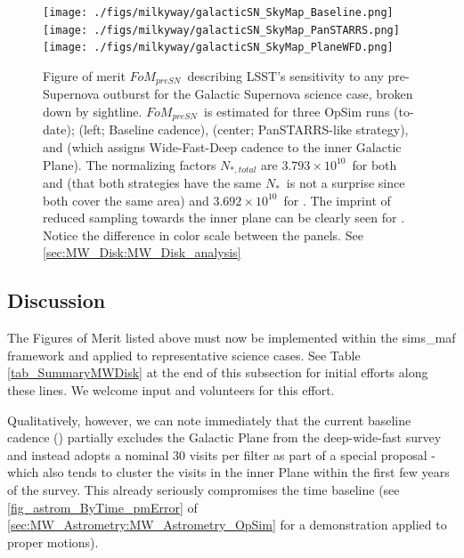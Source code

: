 \begin{figure}
\begin{center}
  \texttt{[image: ./figs/milkyway/galacticSN\_SkyMap\_Baseline.png]}
  \texttt{[image: ./figs/milkyway/galacticSN\_SkyMap\_PanSTARRS.png]}
  \texttt{[image: ./figs/milkyway/galacticSN\_SkyMap\_PlaneWFD.png]}
  \caption{Figure of merit $FoM_{preSN}$~describing LSST's sensitivity
  to any pre-Supernova outburst for the Galactic Supernova science case,
  broken down by sightline. $FoM_{preSN}$~is estimated for
  three OpSim runs (to-date);  (left; Baseline
  cadence),  (center; PanSTARRS-like
  strategy), and  (which assigns Wide-Fast-Deep cadence to the inner Galactic Plane). The normalizing factors $N_{\ast, total}$ are $3.793 \times 10^{10}$~for both  and  (that both strategies have the same $N_\ast$~is not a surprise since both cover the same area) and $3.692\times
  10^{10}$~for . The imprint of reduced sampling towards
  the inner plane can be clearly seen for .
  Notice the difference in color scale between the panels. See \autoref{sec:MW_Disk:MW_Disk_analysis}}
\label{f_opSim_GalacticSN}
\end{center}
\end{figure}






\subsection{Discussion}
\label{sec:\secname:MW_Disk_discussion}

The Figures of Merit listed above must now be implemented within the
sims\_maf framework and applied to representative science cases.
See Table \ref{tab_SummaryMWDisk} at the end of this subsection for
initial efforts along these lines. We welcome input and volunteers for
this effort.

Qualitatively, however, we can note immediately that the current
baseline cadence () partially excludes the
Galactic Plane from the deep-wide-fast survey and instead adopts a
nominal 30 visits per filter as part of a special proposal - which
also tends to cluster the visits in the inner Plane within the first
few years of the survey. This already seriously compromises the time
baseline (see \autoref{fig_astrom_ByTime_pmError} of
\autoref{sec:MW_Astrometry:MW_Astrometry_OpSim} for a demonstration applied to
proper motions).

